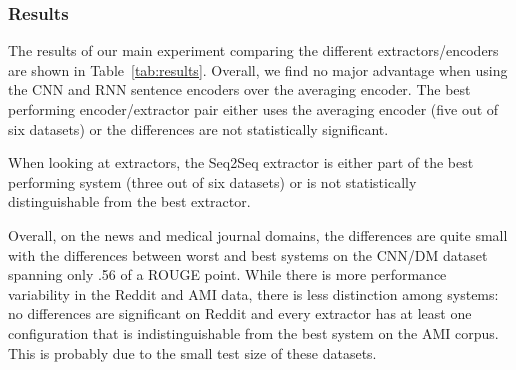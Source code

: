  

 \subsubsection{Results}

 
  

The results of our main experiment comparing 
the different extractors/encoders are shown in 
Table~\ref{tab:results}.
Overall, we find no major advantage when using the CNN and RNN sentence
encoders over the averaging encoder. The best performing encoder/extractor pair either 
uses the averaging 
encoder (five out of six datasets) or the differences 
are not statistically significant. %



When looking at extractors, the Seq2Seq extractor is either part of 
the best performing system (three out of six datasets) or is not 
statistically distinguishable from the best extractor. 

Overall, on the news and medical journal domains, the differences are 
quite small with the 
differences between worst and best systems on the CNN/DM dataset 
spanning only .56 of a ROUGE point. While there is more performance variability
 in the Reddit and AMI data, there is less distinction among systems: 
 no differences are significant on Reddit
and every extractor has at least one configuration that is indistinguishable
from the best system on the AMI corpus. This is probably due to the small test
size of these datasets.





